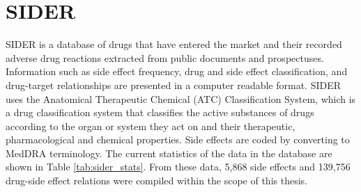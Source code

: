 \section{SIDER}

SIDER \cite{kuhn2010side, kuhn2016sider} is a database of drugs that have entered the market and their recorded adverse drug reactions extracted from public documents and prospectuses. Information such as side effect frequency, drug and side effect classification, and drug-target relationships are presented in a computer readable format. SIDER uses the Anatomical Therapeutic Chemical (ATC) Classification System, which is a drug classification system that classifies the active substances of drugs according to the organ or system they act on and their therapeutic, pharmacological and chemical properties. Side effects are coded by converting to MedDRA terminology. The current statistics of the data in the database are shown in Table \ref{tab:sider_stats}. From these data, 5,868 side effects and 139,756 drug-side effect relations were compiled within the scope of this thesis.

